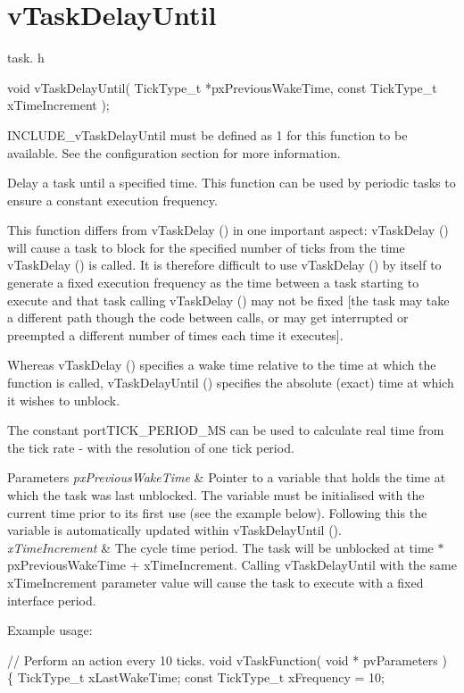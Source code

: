 \hypertarget{group__v_task_delay_until}{}\section{v\+Task\+Delay\+Until}
\label{group__v_task_delay_until}
task. h 
\begin{DoxyPre}void vTaskDelayUntil( TickType\_t *pxPreviousWakeTime, const TickType\_t xTimeIncrement );\end{DoxyPre}


I\+N\+C\+L\+U\+D\+E\+\_\+v\+Task\+Delay\+Until must be defined as 1 for this function to be available. See the configuration section for more information.

Delay a task until a specified time. This function can be used by periodic tasks to ensure a constant execution frequency.

This function differs from v\+Task\+Delay () in one important aspect\+: v\+Task\+Delay () will cause a task to block for the specified number of ticks from the time v\+Task\+Delay () is called. It is therefore difficult to use v\+Task\+Delay () by itself to generate a fixed execution frequency as the time between a task starting to execute and that task calling v\+Task\+Delay () may not be fixed \mbox{[}the task may take a different path though the code between calls, or may get interrupted or preempted a different number of times each time it executes\mbox{]}.

Whereas v\+Task\+Delay () specifies a wake time relative to the time at which the function is called, v\+Task\+Delay\+Until () specifies the absolute (exact) time at which it wishes to unblock.

The constant port\+T\+I\+C\+K\+\_\+\+P\+E\+R\+I\+O\+D\+\_\+\+MS can be used to calculate real time from the tick rate -\/ with the resolution of one tick period.


\begin{DoxyParams}{Parameters}
{\em px\+Previous\+Wake\+Time} & Pointer to a variable that holds the time at which the task was last unblocked. The variable must be initialised with the current time prior to its first use (see the example below). Following this the variable is automatically updated within v\+Task\+Delay\+Until ().\\
\hline
{\em x\+Time\+Increment} & The cycle time period. The task will be unblocked at time $\ast$px\+Previous\+Wake\+Time + x\+Time\+Increment. Calling v\+Task\+Delay\+Until with the same x\+Time\+Increment parameter value will cause the task to execute with a fixed interface period.\\
\hline
\end{DoxyParams}
Example usage\+: 
\begin{DoxyPre}
// Perform an action every 10 ticks.
void vTaskFunction( void * pvParameters )
\{
TickType\_t xLastWakeTime;
const TickType\_t xFrequency = 10;\end{DoxyPre}



